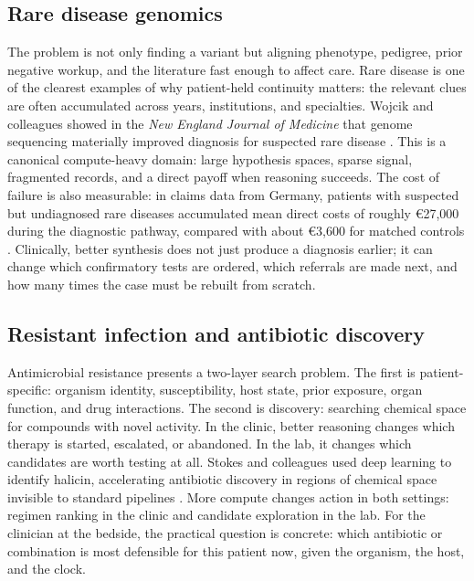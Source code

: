 \documentclass[11pt]{article}
\begin{document}
\subsection{Rare disease genomics}
The problem is not only finding a variant but aligning phenotype, pedigree, prior negative workup, and the literature fast enough to affect care. Rare disease is one of the clearest examples of why patient-held continuity matters: the relevant clues are often accumulated across years, institutions, and specialties. Wojcik and colleagues showed in the \emph{New England Journal of Medicine} that genome sequencing materially improved diagnosis for suspected rare disease \citep{wojcik2024}. This is a canonical compute-heavy domain: large hypothesis spaces, sparse signal, fragmented records, and a direct payoff when reasoning succeeds. The cost of failure is also measurable: in claims data from Germany, patients with suspected but undiagnosed rare diseases accumulated mean direct costs of roughly \euro{27,000} during the diagnostic pathway, compared with about \euro{3,600} for matched controls \citep{glaubitz2025}. Clinically, better synthesis does not just produce a diagnosis earlier; it can change which confirmatory tests are ordered, which referrals are made next, and how many times the case must be rebuilt from scratch.

\subsection{Resistant infection and antibiotic discovery}
Antimicrobial resistance presents a two-layer search problem. The first is patient-specific: organism identity, susceptibility, host state, prior exposure, organ function, and drug interactions. The second is discovery: searching chemical space for compounds with novel activity. In the clinic, better reasoning changes which therapy is started, escalated, or abandoned. In the lab, it changes which candidates are worth testing at all. Stokes and colleagues used deep learning to identify halicin, accelerating antibiotic discovery in regions of chemical space invisible to standard pipelines \citep{stokes2020}. More compute changes action in both settings: regimen ranking in the clinic and candidate exploration in the lab. For the clinician at the bedside, the practical question is concrete: which antibiotic or combination is most defensible for this patient now, given the organism, the host, and the clock.
\end{document}

